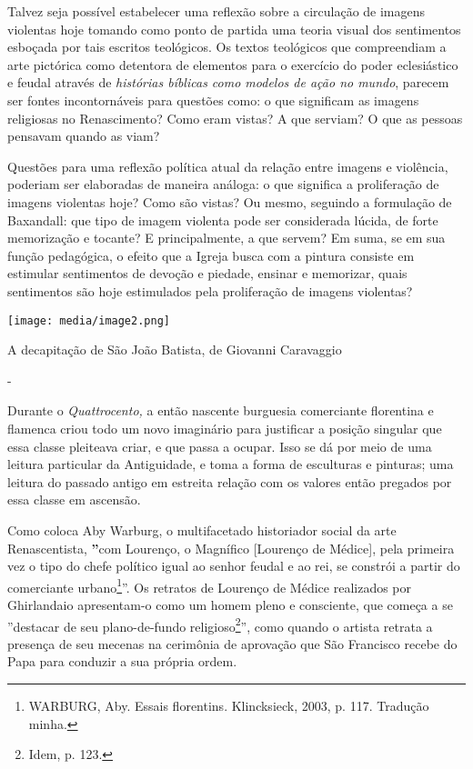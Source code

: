 Talvez seja possível estabelecer uma reflexão sobre a circulação de
imagens violentas hoje tomando como ponto de partida uma teoria visual
dos sentimentos esboçada por tais escritos teológicos. Os textos
teológicos que compreendiam a arte pictórica como detentora de elementos
para o exercício do poder eclesiástico e feudal através de
\emph{histórias bíblicas como modelos de ação no mundo}, parecem ser
fontes incontornáveis para questões como: o que significam as imagens
religiosas no Renascimento? Como eram vistas? A que serviam? O que as
pessoas pensavam quando as viam?

Questões para uma reflexão política atual da relação entre imagens e
violência, poderiam ser elaboradas de maneira análoga: o que significa a
proliferação de imagens violentas hoje? Como são vistas? Ou mesmo,
seguindo a formulação de Baxandall: que tipo de imagem violenta pode ser
considerada lúcida, de forte memorização e tocante? E principalmente, a
que servem? Em suma, se em sua função pedagógica, o efeito que a Igreja
busca com a pintura consiste em estimular sentimentos de devoção e
piedade, ensinar e memorizar, quais sentimentos são hoje estimulados
pela proliferação de imagens violentas?

\texttt{[image: media/image2.png]}

A decapitação de São João Batista, de Giovanni Caravaggio

-

Durante o \emph{Quattrocento,} a então nascente burguesia comerciante
florentina e flamenca criou todo um novo imaginário para justificar a
posição singular que essa classe pleiteava criar, e que passa a ocupar.
Isso se dá por meio de uma leitura particular da Antiguidade, e toma a
forma de esculturas e pinturas; uma leitura do passado antigo em
estreita relação com os valores então pregados por essa classe em
ascensão.

Como coloca Aby Warburg, o multifacetado historiador social da arte
Renascentista, \textbf{''}com Lourenço, o Magnífico {[}Lourenço de
Médice{]}, pela primeira vez o tipo do chefe político igual ao senhor
feudal e ao rei, se constrói a partir do comerciante urbano\footnote{WARBURG,
  Aby. Essais florentins. Klincksieck, 2003, p. 117. Tradução minha.}''.
Os retratos de Lourenço de Médice realizados por Ghirlandaio
apresentam-o como um homem pleno e consciente, que começa a se
''destacar de seu plano-de-fundo religioso\footnote{Idem, p. 123.}'',
como quando o artista retrata a presença de seu mecenas na cerimônia de
aprovação que São Francisco recebe do Papa para conduzir a sua própria
ordem.

